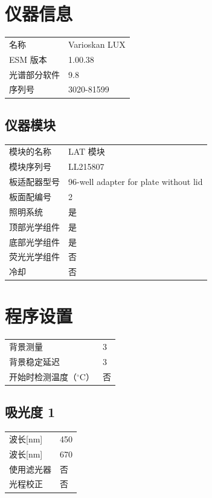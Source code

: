 \documentclass[UTF8,10pt,a4paper,fontset=fandol]{ctexart}
\begin{document}
\section*{仪器信息}

\begin{tabular}{@{}ll@{}}
名称 & Varioskan LUX\\
ESM 版本 & 1.00.38\\
光谱部分软件 & 9.8\\
序列号 & 3020-81599
\end{tabular}

\subsection*{仪器模块}

\begin{tabular}{@{}ll@{}}
模块的名称 & LAT 模块\\
模块序列号 & LL215807\\
板适配器型号 & 96-well adapter for plate without lid\\
板面配编号 & 2\\[2pt]
照明系统 & 是\\
顶部光学组件 & 是\\
底部光学组件 & 是\\
荧光光学组件 & 否\\
冷却 & 否
\end{tabular}

\section*{程序设置}

\begin{tabular}{@{}ll@{}}
背景测量 & 3\\
背景稳定延迟 & 3\\
开始时检测温度（$^\circ$C） & 否
\end{tabular}

\subsection*{吸光度 1}

\begin{tabular}{@{}ll@{}}
波长[nm] & 450\\
波长[nm] & 670\\
使用滤光器 & 否\\
光程校正 & 否
\end{tabular}
\end{document}
